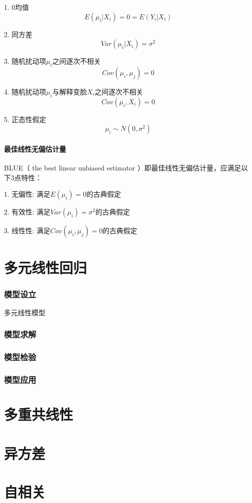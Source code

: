 \documentclass[a4paper，UTF8]{article}
\begin{document}
1. 0均值
\begin{equation}
E(\mu_i|X_i) = 0 = E(Y_i|X_i)
\end{equation}

2. 同方差
\begin{equation}
Var(\mu_i|X_i) = \sigma^2
\end{equation}

3. 随机扰动项$\mu_i$之间逐次不相关
\begin{equation}
Cov(\mu_i,\mu_j) = 0
\end{equation}

4. 随机扰动项$\mu_i$与解释变脸$X_i$之间逐次不相关
\begin{equation}
Cov(\mu_i,X_i) = 0
\end{equation}

5. 正态性假定
\begin{equation}
\mu_i \sim N(0,\sigma^2)
\end{equation}

\subsection{最佳线性无偏估计量}
  BLUE（ the best linear unbiased estimator ）即最佳线性无偏估计量，应满足以下3点特性：
  
1. 无偏性:
满足$E(\mu_i) = 0$的古典假定

2. 有效性:
满足$Var(\mu_i) = \sigma^2$的古典假定

3. 线性性:
满足$Cov(\mu_i,\mu_j) = 0$的古典假定


\part{多元线性回归}

\section{模型设立}
多元线性模型
\section{模型求解}
\section{模型检验}
\section{模型应用}


\part{多重共线性}
\part{异方差}
\part{自相关}
\end{document}
